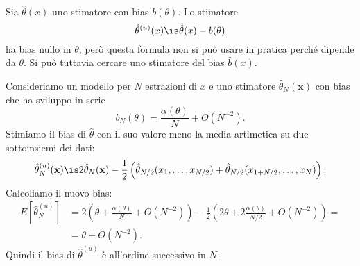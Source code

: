 Sia $\hat\theta(x)$ uno stimatore con bias $b(\theta)$.
Lo stimatore
\begin{equation*}
	\hat\theta^{(u)}(x)
	\is \hat\theta(x) - b(\theta)
\end{equation*}
ha bias nullo in $\theta$,
però questa formula non si può usare in pratica perché dipende da $\theta$.
Si può tuttavia cercare uno stimatore del bias $\hat b(x)$.

Consideriamo un modello per $N$ estrazioni di $x$
e uno stimatore $\hat\theta_N(\mathbf x)$
con bias che ha sviluppo in serie
\begin{equation*}
	b_N(\theta)
	= \frac{\alpha(\theta)}N + O(N^{-2}).
\end{equation*}
Stimiamo il bias di $\hat\theta$ con il suo valore meno la media artimetica su due sottoinsiemi dei dati:
\begin{equation*}
	\hat\theta^{(u)}_N(\mathbf x)
	\is 2\hat\theta_N(\mathbf x)
	- \frac12 \left( \hat\theta_{N/2}(x_1,\dots,x_{N/2}) + \hat\theta_{N/2}(x_{1+N/2},\dots,x_N) \right).
\end{equation*}
Calcoliamo il nuovo bias:
\begin{align*}
	E[\hat\theta^{(u)}_N]
	&= 2 \left( \theta + \frac{\alpha(\theta)}N + O(N^{-2}) \right)
	- \frac12 \left( 2\theta + 2 \frac{\alpha(\theta)}{N/2} + O(N^{-2}) \right) = \\
	&= \theta + O(N^{-2}).
\end{align*}
Quindi il bias di $\hat\theta^{(u)}$ è all'ordine successivo in $N$.
